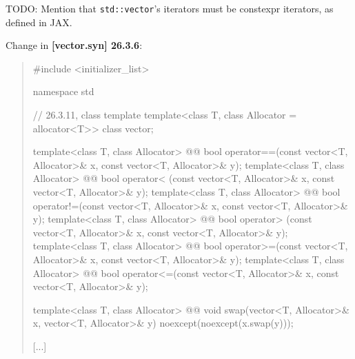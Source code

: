 \documentclass{wg21}
\newcommand{\cc}[1]{\texttt{#1}}
\begin{document}
TODO: Mention that \cc{std::vector}'s iterators must be constexpr iterators,
as defined in JAX.

Change in \textbf{[vector.syn] 26.3.6}:
\begin{quote}
\begin{codeblock}
#include <initializer_list>

namespace std {
  // 26.3.11, class template 
  template<class T, class Allocator = allocator<T>> class vector;

  template<class T, class Allocator>
    @@ bool operator==(const vector<T, Allocator>& x, const vector<T, Allocator>& y);
  template<class T, class Allocator>
    @@ bool operator< (const vector<T, Allocator>& x, const vector<T, Allocator>& y);
  template<class T, class Allocator>
    @@ bool operator!=(const vector<T, Allocator>& x, const vector<T, Allocator>& y);
  template<class T, class Allocator>
    @@ bool operator> (const vector<T, Allocator>& x, const vector<T, Allocator>& y);
  template<class T, class Allocator>
    @@ bool operator>=(const vector<T, Allocator>& x, const vector<T, Allocator>& y);
  template<class T, class Allocator>
    @@ bool operator<=(const vector<T, Allocator>& x, const vector<T, Allocator>& y);

  template<class T, class Allocator>
    @@ void swap(vector<T, Allocator>& x, vector<T, Allocator>& y)
      noexcept(noexcept(x.swap(y)));

  [...]
}
\end{codeblock}
\end{quote}
\end{document}
